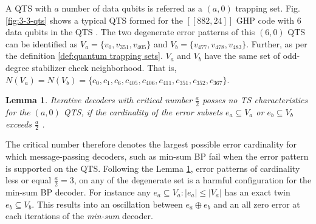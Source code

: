 \documentclass[%
 reprint,
 amsmath,amssymb,
 aps,
pra,
showkeys,
]{revtex4-2}
\newtheorem{lemma}{Lemma}
\begin{document}
A QTS with $a$ number of data qubits is referred as a $(a,0)$ trapping set.
Fig. \ref{fig:3-3-qts} shows a typical QTS formed for the $[[882,24]]$ GHP code with $6$ data qubits in the QTS \cite{chytas2024collective}.
The two degenerate error patterns of this $(6,0)$ QTS can be identified as $V_a = \{v_0, v_{351}, v_{405}\}$ and $V_b = \{v_{477}, v_{478}, v_{483}\}$.
Further, as per the definition \ref{def:quantum trapping sets}. $V_a$ and $V_b$ have the same set of odd-degree stabilizer check neighborhood. That is, $N(V_a) = N(V_b) = \{c_0, c_1, c_6, c_{405}, c_{406}, c_{411}, c_{351}, c_{352}, c_{367}\}$.
\begin{lemma}
    \label{lem:qts}
    Iterative decoders with critical number $\frac{a}{2}$ posses no TS characteristics for the $(a,0)$ QTS, if the cardinality of the error subsets $e_a \subseteq V_a$ or $e_b \subseteq V_b$ exceeds $\frac{a}{2}$ \cite{raveendran2021trapping}.
\end{lemma}
The critical number therefore denotes the largest possible error cardinality for which message-passing decoders, such as min-sum BP fail when the error pattern is supported on the QTS. 
Following the Lemma \ref{lem:qts}, error patterns of cardinality less or equal $\frac{a}{2} = 3$, on any of the degenerate set is a harmful configuration for the min-sum BP decoder.
For instance any $e_a \subseteq V_a : |e_a| \leq |V_a|$ has an exact twin $e_b \subseteq V_b$.
This results into an oscillation between $e_a \oplus e_b$ and an all zero error at each iterations of the \textit{min-sum} decoder.
\end{document}
